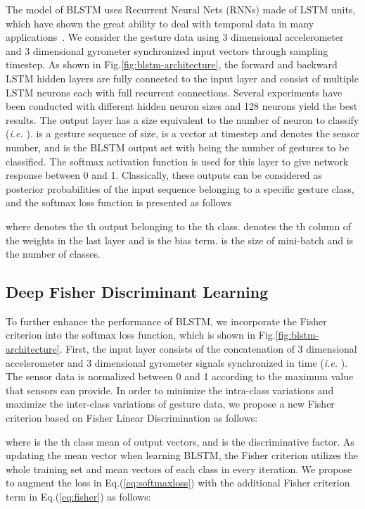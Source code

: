 \documentclass[review]{elsarticle}
\begin{document}
The model of {BLSTM uses Recurrent Neural Nets (RNNs)} made of LSTM units, which have shown the great ability to deal with temporal data in many applications~\cite{sundermeyer2012lstm}. We consider the gesture data using 3 dimensional accelerometer and 3 dimensional gyrometer synchronized input vectors through sampling timestep. As shown in Fig.\;\ref{fig:blstm-architecture}, the forward and backward LSTM hidden layers are fully connected to the input layer and consist of multiple LSTM neurons each with full recurrent connections. Several experiments have been conducted with different hidden neuron sizes and 128 neurons yield the best results. The output layer has a size equivalent to the number of neuron to classify (\emph{i.e.} ).  is a gesture sequence of  size,  is a vector at timestep  and  denotes the sensor number, and  is the BLSTM output set with  being the number of gestures to be classified. The softmax activation function is used for this layer to give network response between 0 and 1. Classically, these outputs can be considered as posterior probabilities of the input sequence belonging to a specific gesture class, and the softmax loss function is presented as follows

where  denotes the {th output belonging to the th class}.  denotes the th column of the weights  in the last layer and  is the bias term.  is the size of mini-batch and  is the number of classes.




\subsection{Deep Fisher Discriminant Learning }\label{sec:fisherloss}

To further enhance the performance of BLSTM, we incorporate the Fisher criterion into the softmax loss function, which is shown in Fig.\;\ref{fig:blstm-architecture}. First, the input layer consists of the concatenation of 3 dimensional accelerometer and 3 dimensional gyrometer signals synchronized in time (\emph{i.e.} ). The sensor data is normalized between 0 and 1 according to the maximum value that sensors can provide.
In order to minimize the intra-class variations and maximize the inter-class variations of gesture data, we propose a new Fisher criterion based on Fisher Linear Discrimination as follows:

where  is the th class mean of output vectors, and  is the discriminative factor. As updating the mean vector  when learning BLSTM, the Fisher criterion utilizes the whole training set and mean vectors of each class in every iteration. We propose to augment the loss in Eq.\;(\ref{eq:softmaxloss}) with the additional Fisher criterion term in Eq.\;(\ref{eq:fisher}) as follows:
\end{document}
